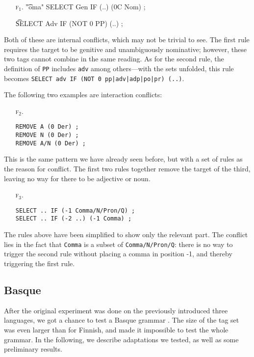 {{\begin{itemize}
\item[\textsc{f$_1$}.]\t{"oma" SELECT Gen IF (..) (0C Nom) ;}

\item[] \t{SELECT Adv IF (NOT 0 PP) (..) ;}
\end{itemize}

Both of these are internal conflicts, which may not be trivial to see.
The first rule requires the target to be genitive and unambiguously nominative; however, these two tags cannot combine in the same reading.
As for the second rule, the definition of \texttt{PP} includes \texttt{adv} among others---with the sets unfolded, this rule becomes \texttt{SELECT~adv~IF~(NOT~0~pp|adv|adp|po|pr)~(..)}.

The following two examples are interaction conflicts:

\begin{itemize}
\item[\textsc{f$_2$}.]\begin{verbatim}
REMOVE A (0 Der) ; 
REMOVE N (0 Der) ; 
REMOVE A/N (0 Der) ; 
\end{verbatim}
\end{itemize}

This is the same pattern we have already seen before, but with a set of rules as the reason for conflict.
The first two rules together remove the target of the third, leaving no way for there to be adjective or noun.

\begin{itemize}
\item[\textsc{f$_3$.}]\begin{verbatim}
SELECT .. IF (-1 Comma/N/Pron/Q) ;
SELECT .. IF (-2 ..) (-1 Comma) ;
\end{verbatim}
\end{itemize}

The rules above have been simplified to show only the relevant part.
The conflict lies in the fact that \texttt{Comma} is a subset of \texttt{Comma/N/Pron/Q}:
there is no way to trigger the second rule without placing a comma in position -1, and thereby triggering the first rule.


\subsection{Basque} 
\label{sec:basqueEval}

After the original experiment was done on the previously introduced three languages, we got a chance to test a Basque grammar \cite{aduriz1997euscg}. The size of the tag set was even larger than for Finnish, and made it impossible to test the whole grammar.
In the following, we describe adaptations we tested, as well as some preliminary results.


}}
